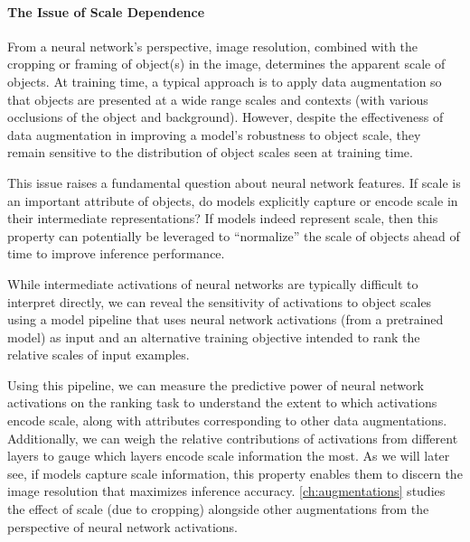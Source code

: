 \paragraph{The Issue of Scale Dependence}
From a neural network's perspective, image resolution, combined with the cropping or framing of object(s) in the image, determines the apparent scale of objects.
At training time, a typical approach is to apply data augmentation so that objects are presented at a wide range scales and contexts (with various occlusions of the object and background).
However, despite the effectiveness of data augmentation in improving a model's robustness to object scale, they remain sensitive to the distribution of object scales seen at training time.

This issue raises a fundamental question about neural network features.
If scale is an important attribute of objects, do models explicitly capture or encode scale in their intermediate representations?
If models indeed represent scale, then this property can potentially be leveraged to ``normalize'' the scale of objects ahead of time to improve inference performance.

While intermediate activations of neural networks are typically difficult to interpret directly, we can reveal the sensitivity of activations to object scales using a model pipeline that uses neural network activations (from a pretrained model) as input and an alternative training objective intended to rank the relative scales of input examples.

Using this pipeline, we can measure the predictive power of neural network activations on the ranking task to understand the extent to which activations encode scale, along with attributes corresponding to other data augmentations.
Additionally, we can weigh the relative contributions of activations from different layers to gauge which layers encode scale information the most.
As we will later see, if models capture scale information, this property enables them to discern the image resolution that maximizes inference accuracy.
\autoref{ch:augmentations} studies the effect of scale (due to cropping) alongside other augmentations from the perspective of neural network activations.

